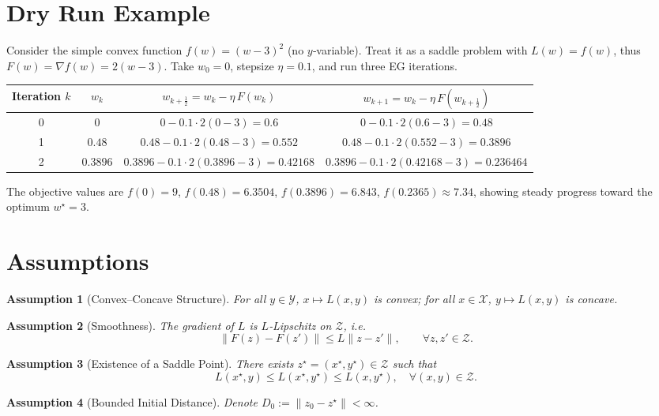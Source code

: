 \documentclass{article}
\newtheorem{assumption}{Assumption}
\begin{document}
\section*{Dry Run Example}
Consider the simple convex function $f(w)=(w-3)^2$ (no $y$‑variable).  
Treat it as a saddle problem with $L(w)=f(w)$, thus $F(w)=\nabla f(w)=2(w-3)$.  
Take $w_0=0$, stepsize $\eta=0.1$, and run three EG iterations.

\begin{center}
\begin{tabular}{c|c|c|c}
Iteration $k$ & $w_k$ & $w_{k+\frac12}=w_k-\eta\,F(w_k)$ & $w_{k+1}=w_k-\eta\,F(w_{k+\frac12})$ \\ \hline
0 & $0$ & $0-0.1\cdot2(0-3)=0.6$ & $0-0.1\cdot2(0.6-3)=0.48$ \\[2mm]
1 & $0.48$ & $0.48-0.1\cdot2(0.48-3)=0.552$ & $0.48-0.1\cdot2(0.552-3)=0.3896$ \\[2mm]
2 & $0.3896$ & $0.3896-0.1\cdot2(0.3896-3)=0.42168$ & $0.3896-0.1\cdot2(0.42168-3)=0.236464$ 
\end{tabular}
\end{center}
The objective values are $f(0)=9$, $f(0.48)=6.3504$, $f(0.3896)=6.843$, $f(0.2365)\approx7.34$, showing steady progress toward the optimum $w^\star=3$.

\newpage
\section*{Assumptions}
\begin{assumption}[Convex–Concave Structure]\label{ass:cc}
For all $y\in\mathcal{Y}$, $x\mapsto L(x,y)$ is convex; for all $x\in\mathcal{X}$, $y\mapsto L(x,y)$ is concave.
\end{assumption}
\begin{assumption}[Smoothness]\label{ass:lip}
The gradient of $L$ is $L$‑Lipschitz on $\mathcal{Z}$, i.e.
\[
\|F(z)-F(z')\|\le L\|z-z'\|,\qquad\forall z,z'\in\mathcal{Z}.
\]
\end{assumption}
\begin{assumption}[Existence of a Saddle Point]\label{ass:saddle}
There exists $z^\star=(x^\star,y^\star)\in\mathcal{Z}$ such that
\[
L(x^\star,y)\le L(x^\star,y^\star)\le L(x,y^\star),\quad\forall (x,y)\in\mathcal{Z}.
\]
\end{assumption}
\begin{assumption}[Bounded Initial Distance]\label{ass:bound}
Denote $D_0:=\|z_0-z^\star\|<\infty$.
\end{assumption}
\end{document}
